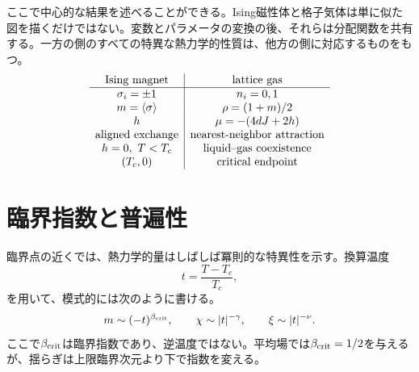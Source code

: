\begin{classroomqa}
\end{classroomqa}

\begin{classroomqa}
\end{classroomqa}

ここで中心的な結果を述べることができる。Ising磁性体と格子気体は単に似た図を描くだけではない。変数とパラメータの変換の後、それらは分配関数を共有する。一方の側のすべての特異な熱力学的性質は、他方の側に対応するものをもつ。
\begin{equation}
\begin{array}{c|c}
\text{Ising magnet} & \text{lattice gas}\\ \hline
\sigma_i=\pm1 & n_i=0,1\\
m=\left\langle\sigma\right\rangle & \rho=(1+m)/2\\
h & \mu=-(4dJ+2h)\\
\text{aligned exchange} & \text{nearest-neighbor attraction}\\
h=0,\ T<T_c & \text{liquid--gas coexistence}\\
(T_c,0) & \text{critical endpoint}
\end{array}
\label{eq:ising-fluid-dictionary}
\end{equation}

\section{臨界指数と普遍性}

臨界点の近くでは、熱力学的量はしばしば冪則的な特異性を示す。換算温度
\begin{equation}
t=\frac{T-T_c}{T_c},
\end{equation}
を用いて、模式的には次のように書ける。
\begin{equation}
m\sim(-t)^{\beta_{\rm crit}},
\qquad
\chi\sim |t|^{-\gamma},
\qquad
\xi\sim |t|^{-\nu}.
\label{eq:critical-exponents}
\end{equation}
ここで\(\beta_{\rm crit}\)は臨界指数であり、逆温度ではない。平均場では\(\beta_{\rm crit}=1/2\)を与えるが、揺らぎは上限臨界次元より下で指数を変える。

